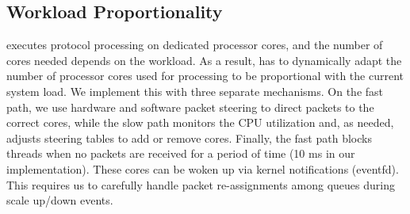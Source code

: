



\subsection{Workload Proportionality}

\rmttcp executes protocol processing on dedicated processor cores, and
the number of cores needed depends on the workload.  As a result,
\rmttcp has to dynamically adapt the number of processor cores used
for processing to be proportional with the current system load.  We
implement this with three separate mechanisms. On the fast path, we
use hardware and software packet steering to direct packets to the
correct cores, while the slow path monitors the CPU utilization and,
as needed, adjusts steering tables to add or remove cores. Finally,
the fast path blocks threads when no packets are received for a period
of time (10 ms in our implementation). These cores can be woken up via
kernel notifications (eventfd). This requires us to carefully handle
packet re-assignments among queues during scale up/down events.

